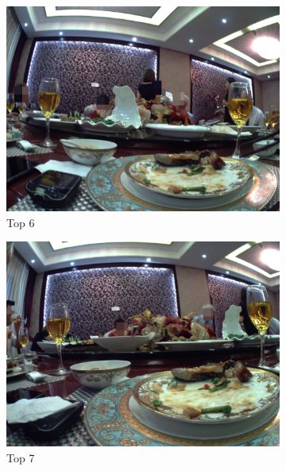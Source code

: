 \begin{figure}[H]
\begin{subfigure}{0.32\textwidth}
        \includegraphics[width=\textwidth]{Sections/7Results/images/run2top6.jpg}\hfill
        \caption{Top 6}
      \end{subfigure}\par\medskip
      \begin{subfigure}{0.32\textwidth}
        \includegraphics[width=\textwidth]{Sections/7Results/images/run2top7.jpg} 
        \caption{Top 7}
      \end{subfigure}
      \begin{subfigure}{0.32\textwidth}

\end{subfigure}
\end{figure}
